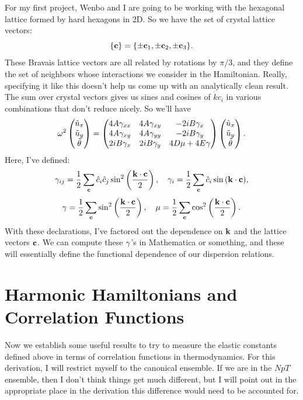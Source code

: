 \documentclass[12pt]{article}
\begin{document}
For my first project, Wenbo and I are going to be working with the hexagonal lattice formed by hard hexagons in 2D. So we have the set of crystal lattice vectors:
\[ \{ \mathbf{c} \} = \{\pm \mathbf{c}_1,\pm \mathbf{c}_2,\pm \mathbf{c}_3\}.\]
These Bravais lattice vectors are all related by rotations by $\pi/3$, and they define the set of neighbors whose interactions we consider in the Hamiltonian. Really, specifying it like this doesn't help us come up with an analytically clean result. The sum over crystal vectors gives us sines and cosines of $\Dot{k}{c_i}$ in various combinations that don't reduce nicely. So we'll have
\[ \omega^2 \left(\begin{matrix}\tilde u_x \\ \tilde u_y \\ \tilde {\theta}\end{matrix}\right) = \left(\begin{matrix}4A \gamma_{xx} & 
4A \gamma_{xy} & -2i B \gamma_{x} \\ 4A \gamma_{xy} & 4A\gamma_{yy} & - 2i B \gamma_{y} \\ 
2i B \gamma_{x} & 2i B\gamma_{y} & 4D \mu + 4 E \gamma\end{matrix}\right) \left(\begin{matrix}\tilde u_x \\ \tilde 
u_y \\ \tilde {\theta}\end{matrix}\right).\]
Here, I've defined:
\[ \gamma_{ij} = \frac{1}{2}\sum_{\mathbf{c}} \hat{c}_{i}\hat{c}_{j} 
\sin^2\left(\frac{\mathbf{k}\cdot\mathbf{c}}{2}\right),\quad \gamma_{i} = \frac{1}{2} \sum_{\mathbf{c}} \hat{c}_i 
\sin{\left(\ensuremath{\mathbf{k}\cdot\mathbf{c}}\right)},\]
\[ \gamma = \frac{1}{2}\sum_{\mathbf{c}} \sin^2\left(\frac{\mathbf{k}\cdot\mathbf{c}}{2}\right),\quad \mu = 
\frac{1}{2} \sum_{\mathbf{c}} \cos^2 \left(\frac{\mathbf{k}\cdot\mathbf{c}}{2}\right).\]
With these declarations, I've factored out the dependence on $\mathbf{k}$ and the lattice vectors $\mathbf{c}$. We can compute these $\gamma$'s in Mathematica or something, and these will essentially define the functional dependence of our dispersion relations.


\section{Harmonic Hamiltonians and Correlation Functions}
Now we establish some useful results to try to measure the elastic constants defined above in terms of correlation functions in thermodynamics. For this derivation, I will restrict myself to the canonical ensemble. If we are in the $NpT$ ensemble, then I don't think things get much different, but I will point out in the appropriate place in the derivation this difference would need to be accounted for.
\end{document}
